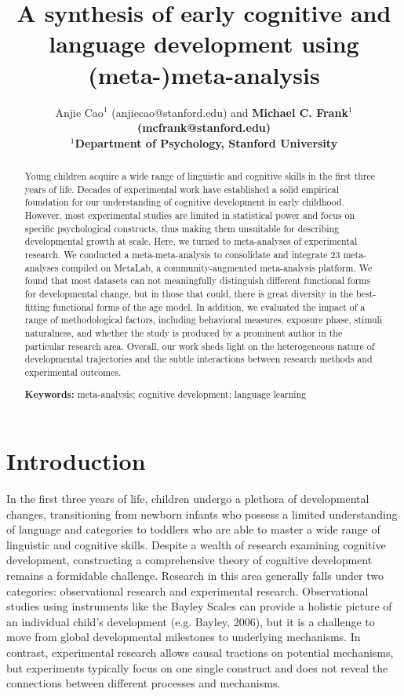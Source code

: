 \documentclass[10pt, letterpaper]{article}
\title{A synthesis of early cognitive and language development using
(meta-)meta-analysis}
\author{Anjie Cao$^1$  (anjiecao@stanford.edu)
 and \bf{Michael C. Frank$^1$ (mcfrank@stanford.edu)} \\
$^1$Department of Psychology, Stanford University }
\begin{document}
\maketitle

\begin{abstract}
Young children acquire a wide range of linguistic and cognitive skills
in the first three years of life. Decades of experimental work have
established a solid empirical foundation for our understanding of
cognitive development in early childhood. However, most experimental
studies are limited in statistical power and focus on specific
psychological constructs, thus making them unsuitable for describing
developmental growth at scale. Here, we turned to meta-analyses of
experimental research. We conducted a meta-meta-analysis to consolidate
and integrate 23 meta-analyses compiled on MetaLab, a
community-augmented meta-analysis platform. We found that most datasets
can not meaningfully distinguish different functional forms for
developmental change, but in those that could, there is great diversity
in the best-fitting functional forms of the age model. In addition, we
evaluated the impact of a range of methodological factors, including
behavioral measures, exposure phase, stimuli naturalness, and whether
the study is produced by a prominent author in the particular research
area. Overall, our work sheds light on the heterogeneous nature of
developmental trajectories and the subtle interactions between research
methods and experimental outcomes.

\textbf{Keywords:}
meta-analysis; cognitive development; language learning
\end{abstract}

\hypertarget{introduction}{%
\section{Introduction}\label{introduction}}

In the first three years of life, children undergo a plethora of
developmental changes, transitioning from newborn infants who possess a
limited understanding of language and categories to toddlers who are
able to master a wide range of linguistic and cognitive skills. Despite
a wealth of research examining cognitive development, constructing a
comprehensive theory of cognitive development remains a formidable
challenge. Research in this area generally falls under two categories:
observational research and experimental research. Observational studies
using instruments like the Bayley Scales can provide a holistic picture
of an individual child's development (e.g. Bayley, 2006), but it is a
challenge to move from global developmental milestones to underlying
mechanisms. In contrast, experimental research allows causal tractions
on potential mechanisms, but experiments typically focus on one single
construct and does not reveal the connections between different
processes and mechanisms.
\end{document}
